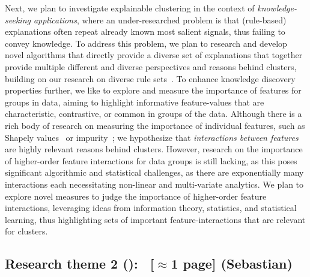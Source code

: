 \documentclass[a4paper,11pt]{article}
\begin{document}
Next, we plan to investigate explainable clustering in the context of \emph{knowledge-seeking applications}, where an under-researched problem is that (rule-based) explanations often repeat already known most salient signals, thus failing to convey knowledge.
To address this problem, we plan to research and develop novel algorithms that directly provide a diverse set of explanations that together provide multiple different and diverse perspectives and reasons behind clusters, building on our research on diverse rule sets~\cite{}.
To enhance knowledge discovery properties further, we like to explore and measure the importance of features for groups in data, aiming to highlight informative feature-values that are characteristic, contrastive, or common in groups of the data.
Although there is a rich body of research on measuring the importance of individual features, such as Shapely values~\cite{} or impurity~\cite{}; we hypothesize that \emph{interactions between features} are highly relevant reasons behind clusters.
However, research on the importance of higher-order feature interactions for data groups is still lacking, 
as this poses significant algorithmic and statistical challenges, as there are exponentially many interactions each necessitating non-linear and multi-variate analytics.  
We plan to explore novel measures to judge the importance of higher-order feature interactions, leveraging ideas from information theory, statistics, and statistical learning,
thus highlighting sets of important feature-interactions that are relevant for clusters.



\subsection*{Research theme 2 (\rtw): \clusterings\ {\color{orange}[$\approx$1 page]} {\color{teal}(Sebastian)}}
\end{document}
